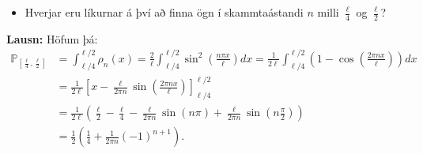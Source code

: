 \ifdefined \wholebook \else\documentclass[oneside]{book}\usepackage{EdlBook}\graphicspath{{figures/}}
\begin{document}
\begin{itemize}
    \item Hverjar eru líkurnar á því að finna ögn í skammtaástandi $n$ milli $\frac{\ell}{4}$ og $\frac{\ell}{2}$?
\end{itemize}

\textbf{Lausn:} Höfum þá:
\begin{align*}
    \mathds{P}_{[\frac{\ell}{4},\frac{\ell}{2}]} &= \int_{\ell/4}^{\ell/2} \rho_n(x) = \frac{2}{\ell} \int_{\ell/4}^{\ell/2} \sin^2\left(\frac{n\pi x}{\ell} \right)dx = \frac{1}{2\ell} \int_{\ell/4}^{\ell/2} \left( 1 - \cos\left( \frac{2 \pi n x}{\ell} \right) \right)dx \\
    &= \frac{1}{2\ell} \left[ x - \frac{\ell}{2\pi n} \sin\left(\frac{2\pi n x}{\ell}\right) \right]_{\ell/4}^{\ell/2} \\
    &= \frac{1}{2\ell} \left( \frac{\ell}{2} - \frac{\ell}{4} - \frac{\ell}{2\pi n} \sin(n\pi ) + \frac{\ell}{2\pi n} \sin\left(n\frac{\pi}{2}\right) \right) \\
    &= \frac{1}{2}\left( \frac{1}{4} + \frac{1}{2\pi n}(-1)^{n+1} \right).
\end{align*}
\end{document}
